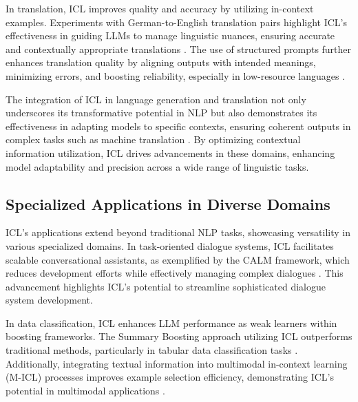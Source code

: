 In translation, ICL improves quality and accuracy by utilizing in-context examples. Experiments with German-to-English translation pairs highlight ICL's effectiveness in guiding LLMs to manage linguistic nuances, ensuring accurate and contextually appropriate translations \cite{sharami2024guidingincontextlearningllms}. The use of structured prompts further enhances translation quality by aligning outputs with intended meanings, minimizing errors, and boosting reliability, especially in low-resource languages \cite{court2024shortcomingsllmslowresourcetranslation,sharami2024guidingincontextlearningllms}.

The integration of ICL in language generation and translation not only underscores its transformative potential in NLP but also demonstrates its effectiveness in adapting models to specific contexts, ensuring coherent outputs in complex tasks such as machine translation \cite{parry2024incontextlearningori,sia2023incontextlearningmaintainingcoherency}. By optimizing contextual information utilization, ICL drives advancements in these domains, enhancing model adaptability and precision across a wide range of linguistic tasks.

\subsection{Specialized Applications in Diverse Domains} \label{subsec:Specialized Applications in Diverse Domains}

ICL's applications extend beyond traditional NLP tasks, showcasing versatility in various specialized domains. In task-oriented dialogue systems, ICL facilitates scalable conversational assistants, as exemplified by the CALM framework, which reduces development efforts while effectively managing complex dialogues \cite{bocklisch2024taskorienteddialogueincontextlearning}. This advancement highlights ICL's potential to streamline sophisticated dialogue system development.

In data classification, ICL enhances LLM performance as weak learners within boosting frameworks. The Summary Boosting approach utilizing ICL outperforms traditional methods, particularly in tabular data classification tasks \cite{manikandan2023languagemodelsweaklearners}. Additionally, integrating textual information into multimodal in-context learning (M-ICL) processes improves example selection efficiency, demonstrating ICL's potential in multimodal applications \cite{luo2024doestextualinformationaffect}.

